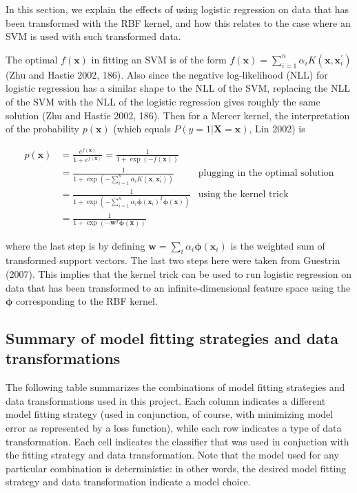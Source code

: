 \documentclass[letterpaper, 11pt]{article}
\newcommand{\vect}[1]{\boldsymbol{#1}}
\begin{document}
In this section, we explain the effects of using logistic regression on data that has been transformed with the RBF kernel, and how this relates to the case where an SVM is used with such transformed data.

The optimal $f(\vect{x})$ in fitting an SVM is of the form $f(\vect{x}) = \sum_{i=1}^{n} \alpha_i K(\vect{x}, \vect{x}_i^\prime)$ (Zhu and Hastie 2002, 186). Also since the negative log-likelihood (NLL) for logistic regression has a similar shape to the NLL of the SVM, replacing the NLL of the SVM with the NLL of the logistic regression gives roughly the same solution (Zhu and Hastie 2002, 186). Then for a Mercer kernel, the interpretation of the probability $p(\vect{x})$ (which equals $P(y = 1 | \vect{X} = \vect{x})$, Lin 2002) is

\begin{align*}
  p(\vect{x}) & = \frac{e^{f(\vect{x})}}{1 + e^{f(\vect{x})}} = \frac{1}{1 + \exp({-f(\vect{x})})} & \\
  & = \frac{1}{1 + \exp(-\sum_{i=1}^{n} \alpha_i K(\vect{x}, \vect{x}_i^\prime))} & \text{plugging in the optimal solution} \\
  & = \frac{1}{1 + \exp(-\sum_{i=1}^{n} \alpha_i \vect{\phi}(\vect{x}_i)^T \vect{\phi}(\vect{x}))} & \text{using the kernel trick} \\
  & = \frac{1}{1 + \exp(-\vect{w}^T \vect{\phi}(\vect{x}))} &
\end{align*}

where the last step is by defining $\vect{w} = \sum_{i} \alpha_i \vect{\phi}(\vect{x}_i)$ is the weighted sum of transformed support vectors. The last two steps here were taken from Guestrin (2007). This implies that the kernel trick can be used to run logistic regression on data that has been transformed to an infinite-dimensional feature space using the $\vect{\phi}$ corresponding to the RBF kernel.

\subsection{Summary of model fitting strategies and data transformations}

The following table summarizes the combinations of model fitting strategies and data transformations used in this project. Each column indicates a different model fitting strategy (used in conjunction, of course, with minimizing model error as represented by a loss function), while each row indicates a type of data transformation. Each cell indicates the classifier that was used in conjuction with the fitting strategy and data transformation. Note that the model used for any particular combination is deterministic: in other words, the desired model fitting strategy and data transformation indicate a model choice.
\end{document}
